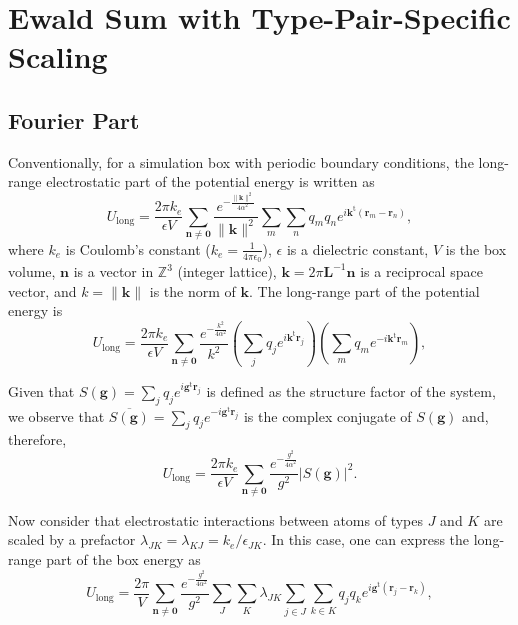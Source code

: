 \documentclass[11pt]{article}
\newcommand{\vt}[1]{\boldsymbol{\mathbf{#1}}}           %
\newcommand{\tr}[1]{#1^\text{t}}                        %
\begin{document}
\section{Ewald Sum with Type-Pair-Specific Scaling}

\subsection{Fourier Part}

Conventionally, for a simulation box with periodic boundary conditions, the long-range electrostatic part of the potential energy is written as
\begin{equation*}
U_\text{long} = \frac{2\pi k_e} {\epsilon V}\sum_{\vt n \neq \vt 0} \frac{e^{-\frac{\|\vt k\|^2}{4\alpha^2}}}{\|\vt k\|^2} \sum_m \sum_n q_m q_n e^{i \tr{\vt k}({\vt r}_m - {\vt r}_n)},
\end{equation*}
where $k_e$ is Coulomb's constant ($k_e = \frac{1}{4\pi\epsilon_0}$), $\epsilon$ is a dielectric constant, $V$ is the box volume, $\vt n$ is a vector in $\mathbb Z^3$ (integer lattice), $\vt k = 2\pi \vt L^{-1}{\vt n}$ is a reciprocal space vector, and $k = \|\vt k\|$ is the norm of $\vt k$. The long-range part of the potential energy is
\begin{equation*}
U_\text{long} = \frac{2\pi k_e}{\epsilon V}\sum_{\vt n \neq \vt 0} \frac{e^{-\frac{k^2}{4\alpha^2}}}{k^2} \left(\sum_j q_j e^{i \tr{\vt k}{\vt r}_j} \right) \left(\sum_m q_m e^{-i \tr{\vt k}{\vt r}_m}\right),
\end{equation*}

Given that $S(\vt g) = \sum_j q_j e^{i \tr{\vt g}{\vt r}_j}$ is defined as the structure factor of the system, we observe that $\overline{S(\vt g)} = \sum_j q_j e^{-i \tr{\vt g}{\vt r}_j}$ is the complex conjugate of $S(\vt g)$ and, therefore,
\begin{equation*}
U_\text{long} = \frac{2\pi k_e}{\epsilon V}\sum_{\vt n \neq \vt 0} \frac{e^{-\frac{g^2}{4\alpha^2}}}{g^2} |S(\vt g)|^2.
\end{equation*}

Now consider that electrostatic interactions between atoms of types $J$ and $K$ are scaled by a prefactor $\lambda_{JK} = \lambda_{KJ} = k_e/\epsilon_{JK}$. In this case, one can express the long-range part of the box energy as
\begin{equation*}
U_\text{long} = \frac{2\pi}{V}\sum_{\vt n \neq \vt 0} \frac{e^{-\frac{g^2}{4\alpha^2}}}{g^2} \sum_J \sum_K \lambda_{JK} \sum_{j \in J} \sum_{k \in K} q_j q_k e^{i \tr{\vt g}({\vt r}_j - {\vt r}_k)},
\end{equation*}
\end{document}
